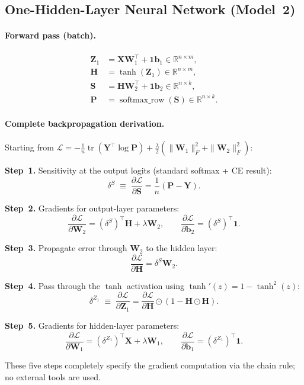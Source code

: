 \documentclass[11pt]{article}
\newcommand{\R}{\mathbb{R}}
\newcommand{\W}{\mathbf{W}}
\newcommand{\bb}{\mathbf{b}}
\newcommand{\bX}{\mathbf{X}}
\newcommand{\bH}{\mathbf{H}}
\newcommand{\bS}{\mathbf{S}}
\newcommand{\bP}{\mathbf{P}}
\newcommand{\bY}{\mathbf{Y}}
\newcommand{\bZ}{\mathbf{Z}}
\newcommand{\loss}{\mathcal{L}}
\begin{document}
\subsection{One-Hidden-Layer Neural Network (Model~2)}

\paragraph{Forward pass (batch).}
\begin{align}
  \bZ_1 &= \bX\W_1^{\top}+\mathbf{1}\bb_1\in\R^{n\times m},\label{eq:z1}\\
  \bH   &= \tanh(\bZ_1)\in\R^{n\times m},\label{eq:h}\\
  \bS   &= \bH\W_2^{\top}+\mathbf{1}\bb_2\in\R^{n\times k},\label{eq:s}\\
  \bP   &= \operatorname{softmax\_row}(\bS)\in\R^{n\times k}.\label{eq:p}
\end{align}

\paragraph{Complete backpropagation derivation.}
Starting from
$\loss=-\frac{1}{n}\operatorname{tr}(\bY^{\top}\log\bP)
+\frac{\lambda}{2}(\|\W_1\|_F^2+\|\W_2\|_F^2)$:

\medskip
\textbf{Step~1.}
Sensitivity at the output logits (standard softmax + CE result):
\[
  \delta^{S}\;\equiv\;\frac{\partial\loss}{\partial\bS}
  =\frac{1}{n}(\bP-\bY).
\]

\textbf{Step~2.}
Gradients for output-layer parameters:
\[
  \frac{\partial\loss}{\partial\W_2}=(\delta^{S})^{\top}\bH+\lambda\W_2,
  \qquad
  \frac{\partial\loss}{\partial\bb_2}=(\delta^{S})^{\top}\mathbf{1}.
\]

\textbf{Step~3.}
Propagate error through $\W_2$ to the hidden layer:
\[
  \frac{\partial\loss}{\partial\bH}=\delta^{S}\W_2.
\]

\textbf{Step~4.}
Pass through the $\tanh$ activation using $\tanh'(z)=1-\tanh^2(z)$:
\[
  \delta^{Z_1}\;\equiv\;\frac{\partial\loss}{\partial\bZ_1}
  =\frac{\partial\loss}{\partial\bH}\odot(1-\bH\odot\bH).
\]

\textbf{Step~5.}
Gradients for hidden-layer parameters:
\[
  \frac{\partial\loss}{\partial\W_1}=(\delta^{Z_1})^{\top}\bX+\lambda\W_1,
  \qquad
  \frac{\partial\loss}{\partial\bb_1}=(\delta^{Z_1})^{\top}\mathbf{1}.
\]

These five steps completely specify the gradient computation via the chain rule;
no external tools are used.
\end{document}
